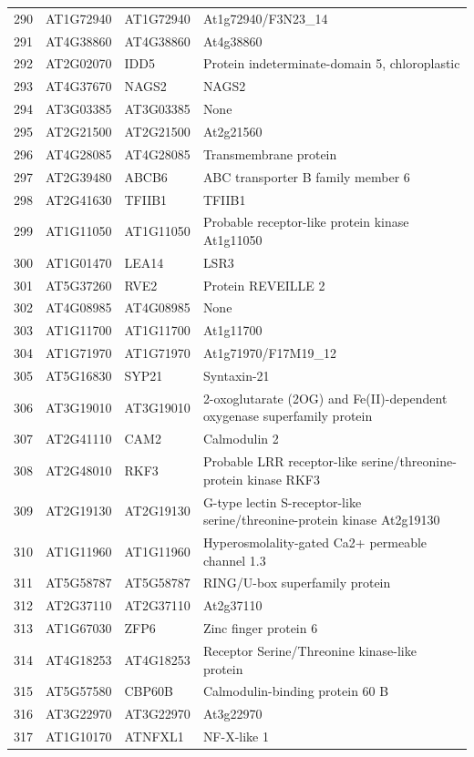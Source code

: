 \documentclass[11pt]{article}
\begin{document}
\begin{center}
\begin{tabular}{rlll}
290 & AT1G72940 & AT1G72940 & At1g72940/F3N23\_14\\
291 & AT4G38860 & AT4G38860 & At4g38860\\
292 & AT2G02070 & IDD5 & Protein indeterminate-domain 5, chloroplastic\\
293 & AT4G37670 & NAGS2 & NAGS2\\
294 & AT3G03385 & AT3G03385 & None\\
295 & AT2G21500 & AT2G21500 & At2g21560\\
296 & AT4G28085 & AT4G28085 & Transmembrane protein\\
297 & AT2G39480 & ABCB6 & ABC transporter B family member 6\\
298 & AT2G41630 & TFIIB1 & TFIIB1\\
299 & AT1G11050 & AT1G11050 & Probable receptor-like protein kinase At1g11050\\
300 & AT1G01470 & LEA14 & LSR3\\
301 & AT5G37260 & RVE2 & Protein REVEILLE 2\\
302 & AT4G08985 & AT4G08985 & None\\
303 & AT1G11700 & AT1G11700 & At1g11700\\
304 & AT1G71970 & AT1G71970 & At1g71970/F17M19\_12\\
305 & AT5G16830 & SYP21 & Syntaxin-21\\
306 & AT3G19010 & AT3G19010 & 2-oxoglutarate (2OG) and Fe(II)-dependent oxygenase superfamily protein\\
307 & AT2G41110 & CAM2 & Calmodulin 2\\
308 & AT2G48010 & RKF3 & Probable LRR receptor-like serine/threonine-protein kinase RKF3\\
309 & AT2G19130 & AT2G19130 & G-type lectin S-receptor-like serine/threonine-protein kinase At2g19130\\
310 & AT1G11960 & AT1G11960 & Hyperosmolality-gated Ca2+ permeable channel 1.3\\
311 & AT5G58787 & AT5G58787 & RING/U-box superfamily protein\\
312 & AT2G37110 & AT2G37110 & At2g37110\\
313 & AT1G67030 & ZFP6 & Zinc finger protein 6\\
314 & AT4G18253 & AT4G18253 & Receptor Serine/Threonine kinase-like protein\\
315 & AT5G57580 & CBP60B & Calmodulin-binding protein 60 B\\
316 & AT3G22970 & AT3G22970 & At3g22970\\
317 & AT1G10170 & ATNFXL1 & NF-X-like 1\\

\end{tabular}
\end{center}
\end{document}
